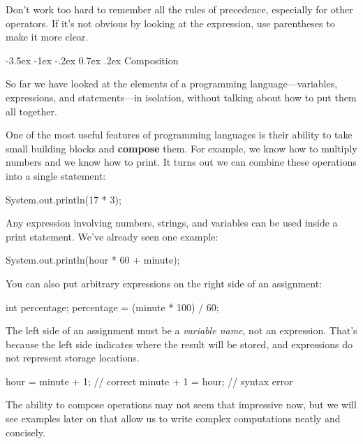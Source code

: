 \documentclass[12pt]{book}
\makeatletter
\theoremstyle{exercise}
\renewcommand{\section}{\@startsection {section}{1}{\z@}%
    {-3.5ex \@plus -1ex \@minus -.2ex}%
    {0.7ex \@plus.2ex}%
    {\normalfont\Large\bfseries}}
\makeatother
\begin{document}
Don't work too hard to remember all the rules of precedence, especially for other operators.
If it's not obvious by looking at the expression, use parentheses to make it more clear.


\section{Composition}


So far we have looked at the elements of a programming language---variables, expressions, and statements---in isolation, without talking about how to put them all together.

One of the most useful features of programming languages is their ability to take small building blocks and {\bf compose} them.
For example, we know how to multiply numbers and we know how to print.
It turns out we can combine these operations into a single statement:

\begin{code}
    System.out.println(17 * 3);
\end{code}

Any expression involving numbers, strings, and variables can be used inside a print statement.
We've already seen one example:

\begin{code}
    System.out.println(hour * 60 + minute);
\end{code}

You can also put arbitrary expressions on the right side of an assignment:

\begin{code}
    int percentage;
    percentage = (minute * 100) / 60;
\end{code}

The left side of an assignment must be a {\em variable name}, not an expression.
That's because the left side indicates where the result will be stored,
and expressions do not represent storage locations.

\begin{code}
    hour = minute + 1;  // correct
    minute + 1 = hour;  // syntax error
\end{code}


The ability to compose operations may not seem that impressive now, but we will see examples later on that allow us to write complex computations neatly and concisely.
\end{document}
